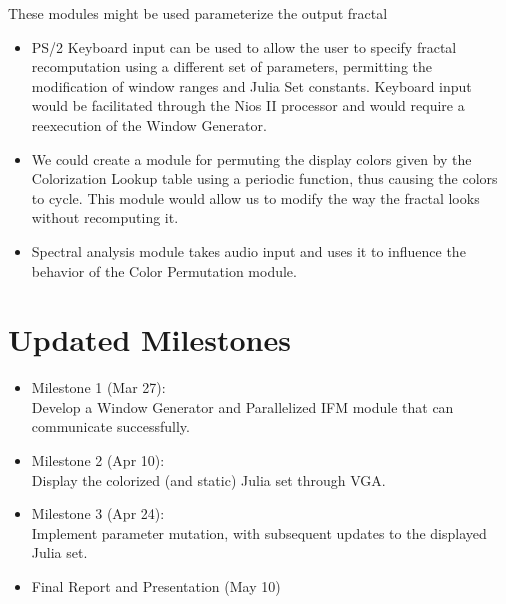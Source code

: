 \documentclass{article}
\begin{document}
These modules might be used parameterize the output fractal

\begin{itemize}
\item PS/2 Keyboard input can be used to allow the user to specify
  fractal recomputation using a different set of parameters,
  permitting the modification of window ranges and Julia Set
  constants. Keyboard input would be facilitated through the Nios II
  processor and would require a reexecution of the Window Generator.
\item We could create a module for permuting the display colors given
  by the Colorization Lookup table using a periodic function, thus
  causing the colors to cycle. This module would allow us to modify
  the way the fractal looks without recomputing it.
\item Spectral analysis module takes audio input and uses it to
  influence the behavior of the Color Permutation module.
\end{itemize}


\section{Updated Milestones}

\begin{itemize}
\item Milestone 1 (Mar 27): \\ Develop a Window Generator and
  Parallelized IFM module that can communicate successfully.
\item Milestone 2 (Apr 10): \\ Display the colorized (and static)
  Julia set through VGA.
\item Milestone 3 (Apr 24): \\ Implement parameter mutation, with
  subsequent updates to the displayed Julia set.
\item Final Report and Presentation (May 10)
\end{itemize}
\end{document}
